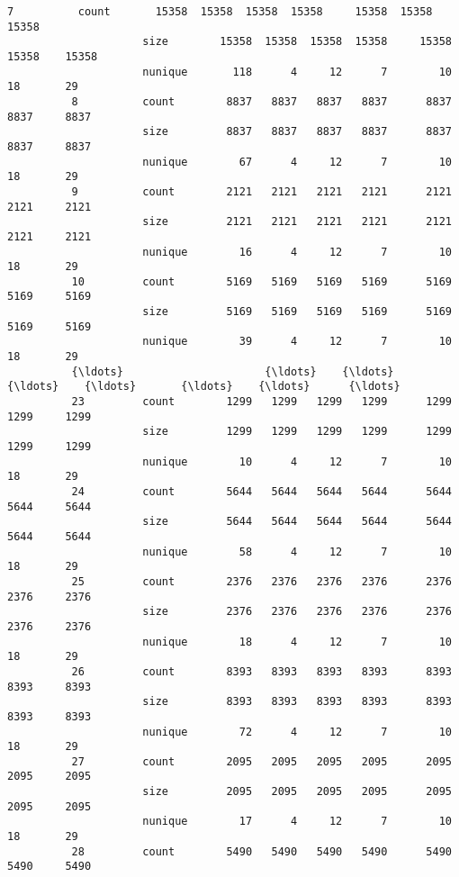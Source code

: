 \documentclass[11pt]{article}
\begin{document}
\begin{Verbatim}[commandchars=\\\{\}]
          7          count       15358  15358  15358  15358     15358  15358    15358   
                     size        15358  15358  15358  15358     15358  15358    15358   
                     nunique       118      4     12      7        10     18       29   
          8          count        8837   8837   8837   8837      8837   8837     8837   
                     size         8837   8837   8837   8837      8837   8837     8837   
                     nunique        67      4     12      7        10     18       29   
          9          count        2121   2121   2121   2121      2121   2121     2121   
                     size         2121   2121   2121   2121      2121   2121     2121   
                     nunique        16      4     12      7        10     18       29   
          10         count        5169   5169   5169   5169      5169   5169     5169   
                     size         5169   5169   5169   5169      5169   5169     5169   
                     nunique        39      4     12      7        10     18       29   
          {\ldots}                      {\ldots}    {\ldots}    {\ldots}    {\ldots}       {\ldots}    {\ldots}      {\ldots}   
          23         count        1299   1299   1299   1299      1299   1299     1299   
                     size         1299   1299   1299   1299      1299   1299     1299   
                     nunique        10      4     12      7        10     18       29   
          24         count        5644   5644   5644   5644      5644   5644     5644   
                     size         5644   5644   5644   5644      5644   5644     5644   
                     nunique        58      4     12      7        10     18       29   
          25         count        2376   2376   2376   2376      2376   2376     2376   
                     size         2376   2376   2376   2376      2376   2376     2376   
                     nunique        18      4     12      7        10     18       29   
          26         count        8393   8393   8393   8393      8393   8393     8393   
                     size         8393   8393   8393   8393      8393   8393     8393   
                     nunique        72      4     12      7        10     18       29   
          27         count        2095   2095   2095   2095      2095   2095     2095   
                     size         2095   2095   2095   2095      2095   2095     2095   
                     nunique        17      4     12      7        10     18       29   
          28         count        5490   5490   5490   5490      5490   5490     5490   

\end{Verbatim}
\end{document}
